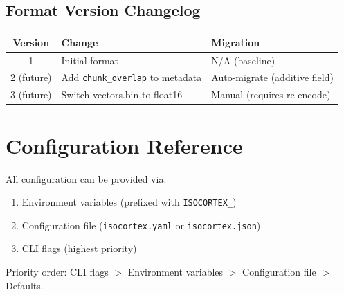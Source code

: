 \documentclass[11pt,a4paper]{article}
\newcommand{\inlinecode}[1]{\texttt{\small\colorbox{ctCodeBg}{#1}}}
\begin{document}
\subsection{Format Version Changelog}

\begin{center}
\begin{tabular}{@{}cp{4cm}p{7cm}@{}}
\toprule
\textbf{Version} & \textbf{Change} & \textbf{Migration} \\
\midrule
1 & Initial format & N/A (baseline) \\
2 (future) & Add \texttt{chunk\_overlap} to metadata & Auto-migrate (additive field) \\
3 (future) & Switch vectors.bin to float16 & Manual (requires re-encode) \\
\bottomrule
\end{tabular}
\end{center}

\newpage
\section{Configuration Reference}

All configuration can be provided via:
\begin{enumerate}
    \item Environment variables (prefixed with \inlinecode{ISOCORTEX\_})
    \item Configuration file (\inlinecode{isocortex.yaml} or \inlinecode{isocortex.json})
    \item CLI flags (highest priority)
\end{enumerate}

Priority order: CLI flags $>$ Environment variables $>$ Configuration file $>$ Defaults.
\end{document}
